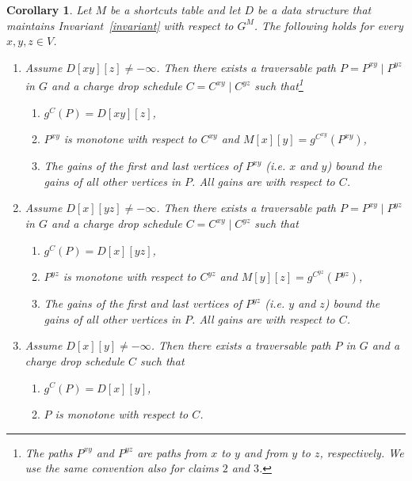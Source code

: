 \documentclass[11pt]{article}
\newtheorem{corollary}[theorem]{Corollary}
\begin{document}
\begin{corollary}\label{cor:M-G-connection}
    Let $M$ be a shortcuts table and let $D$ be a data structure that maintains Invariant~\ref{invariant} with respect to $G^M$. The following holds for every $x,y,z\in V$. 
    \begin{enumerate}
        \item \label{cor:1}
        Assume $D[xy][z]\neq -\infty$. Then there exists a traversable path $P = P^{xy}\mid P^{yz}$ in $G$ and a charge drop schedule $C = C^{xy}\mid C^{yz}$ such that\footnote{The paths $P^{xy}$ and $P^{yz}$ are paths from $x$ to $y$ and from $y$ to $z$, respectively. We use the same convention also for claims $2$ and $3$.}
        \begin{enumerate}[label=(\alph*)]
            \item \label{cor:1a}  $g^C(P) = D[xy][z]$,
            \item \label{cor:1b} $P^{xy}$ is monotone with respect to $C^{xy}$ and $M[x][y] = g^{C^{xy}}(P^{xy})$,
            \item \label{cor:1c} The gains of the first and last vertices of $P^{xy}$ (i.e. $x$ and $y$) bound the gains of all other vertices in $P$. All gains are with respect to $C$.
        \end{enumerate}
        \item \label{cor:2}
        Assume $D[x][yz]\neq -\infty$. Then there exists a traversable path $P = P^{xy}\mid P^{yz}$ in $G$ and a charge drop schedule $C = C^{xy}\mid C^{yz}$ such that
        \begin{enumerate}[label=(\alph*)]
            \item \label{cor:2a} $g^C(P) = D[x][yz]$,
            \item \label{cor:2b} $P^{yz}$ is monotone with respect to $C^{yz}$ and $M[y][z] = g^{C^{yz}}(P^{yz})$,
            \item \label{cor:2c} The gains of the first and last vertices of $P^{yz}$ (i.e. $y$ and $z$) bound the gains of all other vertices in $P$. All gains are with respect to $C$.
        \end{enumerate}
        \item \label{cor:3}
         Assume $D[x][y]\neq -\infty$. Then there exists a traversable path $P $ in $G$ and a charge drop schedule $C$ such that
        \begin{enumerate}[label=(\alph*)]
            \item \label{cor:3a} $g^C(P) = D[x][y]$,
            \item \label{cor:3b} $P$ is monotone with respect to $C$.
        \end{enumerate}
    \end{enumerate}
\end{corollary}
\end{document}

